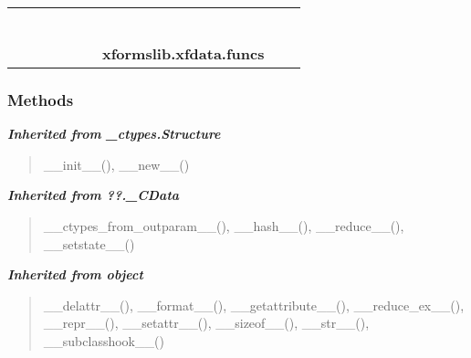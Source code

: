     \label{xformslib:xfdata:funcs}
\begin{tabular}{cccccccccc}
\multicolumn{2}{r}{\settowidth{\BCL}{object}\multirow{2}{\BCL}{object}}
&&
&&
&&
  \\\cline{3-3}
  &&\multicolumn{1}{c|}{}
&&
&&
&&
  \\
\multicolumn{4}{r}{\settowidth{\BCL}{??.\_CData}\multirow{2}{\BCL}{??.\_CData}}
&&
&&
  \\\cline{5-5}
  &&&&\multicolumn{1}{c|}{}
&&
&&
  \\
\multicolumn{6}{r}{\settowidth{\BCL}{\_ctypes.Structure}\multirow{2}{\BCL}{\_ctypes.Structure}}
&&
  \\\cline{7-7}
  &&&&&&\multicolumn{1}{c|}{}
&&
  \\
&&&&&&\multicolumn{2}{l}{\textbf{xformslib.xfdata.funcs}}
\end{tabular}



  \subsubsection{Methods}


\large{\textbf{\textit{Inherited from \_ctypes.Structure}}}

\begin{quote}
\_\_init\_\_(), \_\_new\_\_()
\end{quote}

\large{\textbf{\textit{Inherited from ??.\_CData}}}

\begin{quote}
\_\_ctypes\_from\_outparam\_\_(), \_\_hash\_\_(), \_\_reduce\_\_(), \_\_setstate\_\_()
\end{quote}

\large{\textbf{\textit{Inherited from object}}}

\begin{quote}
\_\_delattr\_\_(), \_\_format\_\_(), \_\_getattribute\_\_(), \_\_reduce\_ex\_\_(), \_\_repr\_\_(), \_\_setattr\_\_(), \_\_sizeof\_\_(), \_\_str\_\_(), \_\_subclasshook\_\_()
\end{quote}


